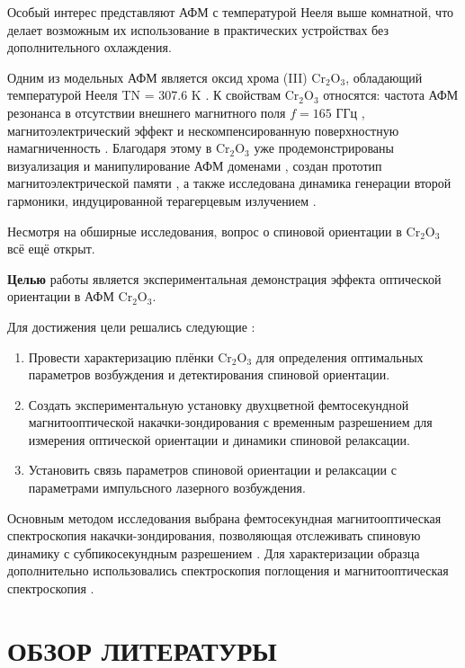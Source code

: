 \documentclass[14pt]{extarticle}
\newcommand{\crome}{\mathrm{Cr}_{2}\mathrm{O}_{3}}
\numberwithin{equation}{section}
\begin{document}
Особый интерес представляют АФМ с температурой Нееля выше комнатной, что делает возможным их использование в практических устройствах без дополнительного охлаждения.

Одним из модельных  АФМ является оксид хрома (III) $\crome$, обладающий температурой Нееля TN = 307.6 K \cite{Neel_temp}. К свойствам $\crome$ относятся: частота АФМ резонанса в отсутствии внешнего магнитного поля $f = 165$ ГГц \cite{Cr2O3_AFM_resonance}, магнитоэлектрический эффект \cite{Astrov_1961} и нескомпенсированную поверхностную намагниченность \cite{Weber}. Благодаря этому в $\crome$ уже продемонстрированы визуализация и манипулирование АФМ доменами \cite{Hayashida_27}, создан прототип магнитоэлектрической памяти \cite{Kosub_32}, а также исследована динамика генерации второй гармоники, индуцированной терагерцевым излучением \cite{Bilyk_33}.


Несмотря на обширные исследования,  вопрос о спиновой ориентации в $\crome$ всё ещё открыт. 



{ \bf Целью}  работы является экспериментальная демонстрация эффекта оптической ориентации в АФМ $\crome$.

    Для достижения цели решались следующие {}:
\begin{enumerate}
    \item Провести характеризацию плёнки $\crome$  для определения оптимальных параметров возбуждения и детектирования  спиновой ориентации.
    
    \item Создать экспериментальную установку  двухцветной фемтосекундной магнитооптической накачки-зондирования с временным разрешением для измерения оптической ориентации и динамики спиновой релаксации.

    \item Установить связь параметров спиновой ориентации и релаксации с параметрами импульсного лазерного возбуждения.

\end{enumerate}
    
    
Основным методом исследования выбрана фемтосекундная магнитооптическая спектроскопия накачки-зондирования, позволяющая отслеживать спиновую динамику с субпикосекундным разрешением \cite{Kirilyuk_Kimel}. Для характеризации образца дополнительно использовались спектроскопия поглощения \cite{kittel1978vvedenie} и магнитооптическая спектроскопия  \cite{smolenskii1974fizika}.

\newpage
\section{ОБЗОР ЛИТЕРАТУРЫ}
\end{document}
